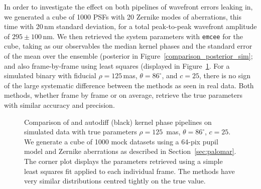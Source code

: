 \documentclass[modern]{aastex63}
\begin{document}
In order to investigate the effect on both pipelines of wavefront errors leaking in, we generated a cube of 1000 PSFs with 20 Zernike modes of aberrations, this time with 20\,nm standard deviation, for a total peak-to-peak wavefront amplitude of $295\pm 100$\,nm. We then retrieved the system parameters with \texttt{emcee} for the cube, taking as our observables the median kernel phases and the standard error of the mean over the ensemble (posterior in Figure~\ref{comparison_posterior_sim}; and also frame-by-frame using least squares (displayed in Figure~\ref{comparison_posterior_sim_cube}. For a simulated binary with fiducial $\rho = 125$\,mas, $\theta=86^\circ$, and $c = 25$, there is no sign of the large systematic difference between the methods as seen in real data. Both methods, whether frame by frame or on average, retrieve the true parameters with similar accuracy and precision. %




\begin{figure}
\caption{Comparison of \citet[][blue linetype]{martinache20} and autodiff (black) kernel phase pipelines on simulated data with true parameters $\rho = 125$~mas, $\theta = 86^\circ$, $c=25$. We generate a cube of 1000 mock datasets using a 64-pix pupil model and Zernike aberrations as described in Section~\ref{sec:palomar}. The corner plot displays the parameters retrieved using a simple least squares fit applied to each individual frame. The methods have very similar distributions centred tightly on the true value. \label{comparison_posterior_sim_cube}}
\end{figure}
\end{document}
